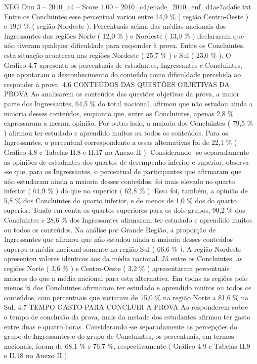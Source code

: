 \begin{textsample}{NEG Dim 3 – 2010\_c4 – Score 1.00 – 2010\_c4/enade\_2010\_enf\_d4ae7ada6c.txt}
Entre os Concluintes esse percentual variou entre 14,9 \% ( região Centro-Oeste ) e 19,9 \% ( região Nordeste ).
Percentuais acima das médias nacionais dos Ingressantes das regiões Norte ( 12,0 \% ) e Nordeste ( 13,0 \% ) declararam que não tiveram qualquer dificuldade para responder à prova.
Entre os Concluintes, esta situação aconteceu nas regiões Nordeste ( 25,7 \% ) e Sul ( 23,0 \% ).
O Gráfico 4.7 apresenta os percentuais de estudantes, Ingressantes e Concluintes, que apontaram o desconhecimento do conteúdo como dificuldade percebida ao responder à prova. 4.6 CONTEÚDOS DAS QUESTÕES OBJETIVAS DA PROVA Ao analisarem os conteúdos das questões objetivas da prova, a maior parte dos Ingressantes, 64,5 \% do total nacional, afirmou que não estudou ainda a maioria desses conteúdos, enquanto que, entre os Concluintes, apenas 2,8 \% expressaram a mesma opinião.
Por outro lado, a maioria dos Concluintes ( 79,5 \% ) afirmou ter estudado e aprendido muitos ou todos os conteúdos.
Para os Ingressantes, o percentual correspondente a essas alternativas foi de 22,1 \% ( Gráfico 4.8 e Tabelas II.8 e II.17 no Anexo II ).
Considerando -se separadamente as opiniões de estudantes dos quartos de desempenho inferior e superior, observa -se que, para os Ingressantes, o percentual de participantes que afirmaram que não estudaram ainda a maioria desses conteúdos, foi mais elevado no quarto inferior ( 64,9 \% ) do que no superior ( 62,8 \% ).
Essa foi, também, a opinião de 5,8 \% dos Concluintes do quarto inferior, e de menos de 1,0 \% dos do quarto superior.
Tendo em conta os quartos superiores para os dois grupos, 90,2 \% dos Concluintes e 28,6 \% dos Ingressantes afirmaram ter estudado e aprendido muitos ou todos os conteúdos.
Na análise por Grande Região, a proporção de Ingressantes que afirmou que não estudou ainda a maioria desses conteúdos superou a média nacional somente na região Sul ( 66,6 \% ).
A região Nordeste apresentou valores idênticos aos da média nacional.
Já entre os Concluintes, as regiões Norte ( 3,6 \% ) e Centro-Oeste ( 3,2 \% ) apresentaram percentuais maiores do que a média nacional para esta alternativa.
Em todas as regiões pelo menos ¾ dos Concluintes afirmaram ter estudado e aprendido muitos ou todos os conteúdos, com percentuais que variaram de 75,0 \% na região Norte a 81,6 \% na Sul. 4.7 TEMPO GASTO PARA CONCLUIR A PROVA Ao responderem sobre o tempo de conclusão da prova, mais da metade dos estudantes afirmou ter gasto entre duas e quatro horas.
Considerando -se separadamente as percepções do grupo de Ingressantes e do grupo de Concluintes, os percentuais, em termos nacionais, foram de 68,1 \% e 76,7 \%, respectivamente ( Gráfico 4.9 e Tabelas II.9 e II.18 no Anexo II ).

\end{textsample}
